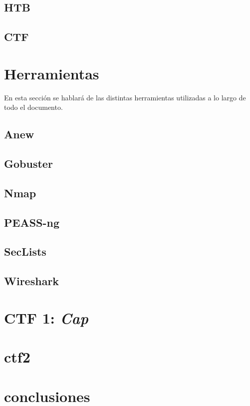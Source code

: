\documentclass[a4paper, 12pt]{article} %
\begin{document}
\begin{otherlanguage}{spanish}
    \subsection{\acrlong{HTB}}
    

    \subsection{\acrlong{CTF}}
    

    \newpage
    \section{Herramientas}
    En esta sección se hablará de las distintas herramientas utilizadas a lo largo de todo el documento.

    \subsection{Anew}
    

    \subsection{Gobuster}
    

    \subsection{Nmap}
    

    \subsection{PEASS-ng}
    

    \subsection{SecLists}
    

    \subsection{Wireshark}
    


    \newpage
    \section{\acrshort{CTF} 1: \textit{Cap}}
    

    \newpage
    \section{ctf2}

    \newpage
    \section{conclusiones}

    \newpage
    \printbibliography[heading=bibnumbered] %

\end{otherlanguage}
\end{document}
